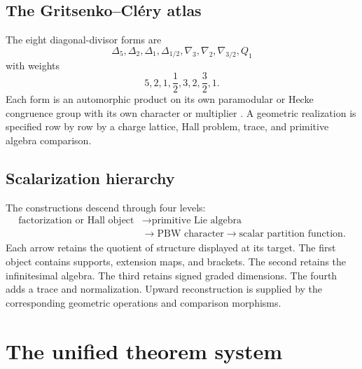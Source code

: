 \chapter{The Gritsenko--Cl\'ery atlas}
The eight diagonal-divisor forms are
\[
 \Delta_5,\Delta_2,\Delta_1,\Delta_{1/2},
 \nabla_3,\nabla_2,\nabla_{3/2},Q_1
\]
with weights
\[
 5,2,1,\frac12,3,2,\frac32,1.
\]
Each form is an automorphic product on its own paramodular or Hecke congruence group with its own character or multiplier \cite{GC}. A geometric realization is specified row by row by a charge lattice, Hall problem, trace, and primitive algebra comparison.

\chapter{Scalarization hierarchy}
The constructions descend through four levels:
\[
\begin{aligned}
 \text{factorization or Hall object}
 &\longrightarrow \text{primitive Lie algebra}\\
 &\longrightarrow \text{PBW character}
 \longrightarrow \text{scalar partition function}.
\end{aligned}
\]
Each arrow retains the quotient of structure displayed at its target. The first object contains supports, extension maps, and brackets. The second retains the infinitesimal algebra. The third retains signed graded dimensions. The fourth adds a trace and normalization. Upward reconstruction is supplied by the corresponding geometric operations and comparison morphisms.

\part{The unified theorem system}

